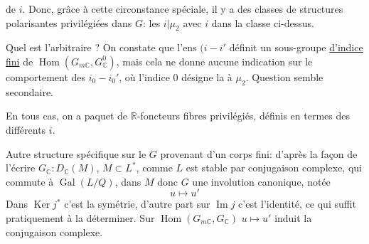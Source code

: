 de $i$. 
Donc, grâce à cette circonstance spéciale, il y a des classes de  structures polarisantes privilégiées dans $G$: les $i|\mu_2$ avec $i$ dans la classe ci-dessus.

Quel est l'arbitraire ? On constate que l'ens  $(i-i'$  définit un sous-groupe \uline{d'indice fini} de $\operatorname{Hom}(G_{m\mathbb C},G^0_{\mathbb C})$, mais cela ne donne aucune indication sur le comportement des $i_0-i_0'$, où l'indice $0$ désigne la  à $\mu_2$. Question semble secondaire.

En tous cas, on a   paquet de $\mathbb R$-foncteurs fibres privilégiés, définis en termes des différents $i$.


Autre structure spécifique sur le $G$ provenant d'un corps fini: d'après la façon de l'écrire $G_{\mathbb C}:D_{\mathbb C}(M)$, $M\subset L^*$, comme $L$ est stable par conjugaison complexe, qui commute à $\operatorname{Gal}(L/Q)$,  dans $M$ donc $G$ une involution canonique, notée
\[
u\longmapsto u'
\]
Dans $\operatorname{Ker}j^*$ c'est la symétrie, d'autre part sur $\operatorname{Im}j$ c'est l'identité, ce qui suffit pratiquement à la déterminer. Sur $\operatorname{Hom}(G_{m\mathbb C},G_{\mathbb C})$ $u\mapsto u'$ induit la conjugaison complexe.
